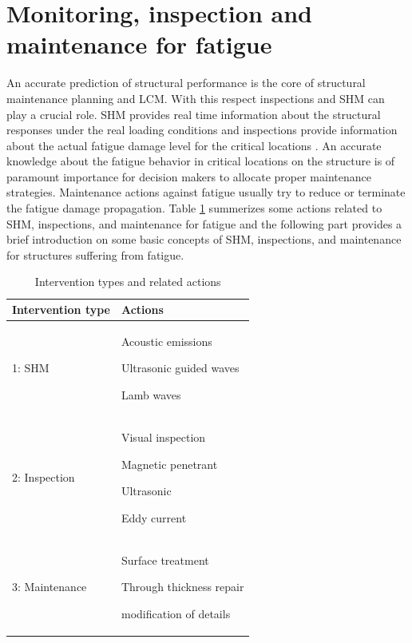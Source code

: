 \section{Monitoring, inspection and maintenance for fatigue}
\label{sec:mon-fatig}
\noindent
An accurate prediction of structural performance is the core of structural maintenance planning and LCM. With this respect inspections and SHM can play a crucial role. SHM provides real time 
information about the structural responses under the real loading conditions and inspections provide information about the actual fatigue damage level for the critical locations \cite{Frang2011}. 
An accurate knowledge about the fatigue behavior in critical locations on the structure is of paramount importance for decision makers to allocate proper maintenance strategies. Maintenance actions
against fatigue usually try to reduce or terminate the fatigue damage propagation. Table \ref{tab:interventions} summerizes some actions related to SHM, inspections, and maintenance for fatigue and 
the following part provides a brief introduction on some basic concepts of SHM, inspections, and maintenance for structures suffering from fatigue. 

\begin{table}[htbp]
\centering

\begin{tabular}{p{} p{}}
\hline
Intervention type & \hspace{0.8cm} Actions\\
\hline
1: SHM &
\begin{compactitem}
\item Acoustic emissions
\item Ultrasonic guided waves
\item Lamb waves
\end{compactitem} \\
2: Inspection
&
\begin{compactitem}
\item Visual inspection
\item Magnetic penetrant
\item Ultrasonic
\item Eddy current
\end{compactitem} \\
3: Maintenance
&
\begin{compactitem}
\item Surface treatment
\item Through thickness repair
\item modification of details
\end{compactitem}\\
\hline
\end{tabular}

\caption{Intervention types and related actions}
\label{tab:interventions}  
\end{table}


